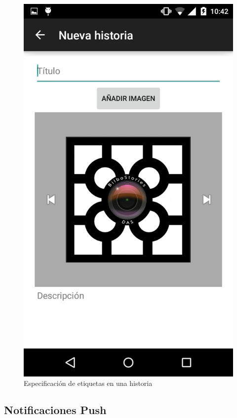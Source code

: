 \documentclass[11pt,a4paper, titlepage]{article}
\begin{document}
		\begin{figure}[hbtp]
			\centering
			\includegraphics[scale = 0.25 ]{img/13}
			\caption{Especificación de etiquetas en una historia}
			\label{p20}
		\end{figure}
		
	\FloatBarrier
	\subsection{Notificaciones Push}
	
\end{document}
